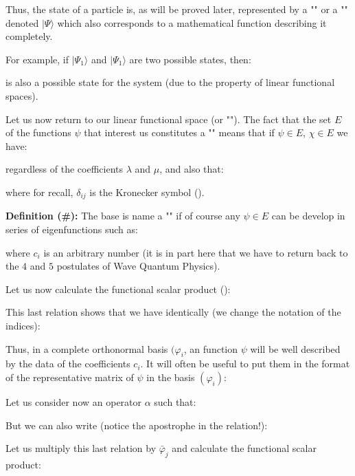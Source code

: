 	Thus, the state of a particle is, as will be proved later, represented by a "" or a "" denoted $|\Psi\rangle$ which also corresponds to a mathematical function describing it completely.

	For example, if $|\Psi_1\rangle$ and $|\Psi_1\rangle$ are two possible states, then:
	
	is also a possible state for the system (due to the property of linear functional  spaces).

	Let us now return to our linear functional  space (or ""). The fact that the set $E$ of the functions $\psi$ that interest us constitutes a "\label{linear functional space}" means that if $\psi\in E$, $\chi\in E$ we have:
	
	regardless of the coefficients $\lambda$ and $\mu$, and also that:
	
	where for recall, $\delta_{ij}$ is the Kronecker symbol ().
	
	\textbf{Definition (\#\mydef):}
	The base is name a "" if of course any $\psi\in E$ can be develop in series of eigenfunctions such as:
	
	where $c_i$ is an arbitrary number (it is in part here that we have to return back to the $4$ and $5$ postulates of Wave Quantum Physics).

Let us now calculate the functional scalar product ():
	
	This last relation shows that we have identically (we change the notation of the indices):
	
	Thus, in a complete orthonormal basis $(\varphi_i$, an function $\psi$ will be well described by the data of the coefficients $c_i$. It will often be useful to put them in the format of the representative matrix of $\psi$ in the basis $(\varphi_i)$:
	
	Let us consider now an operator $\alpha$ such that:
	
	But we can also write (notice the apostrophe in the relation!):
	
	Let us multiply this last relation by $\bar{\varphi}_j$ and calculate the functional scalar product:
	

